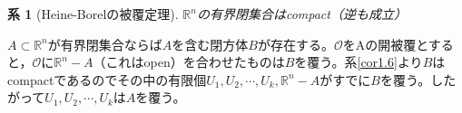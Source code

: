 \documentclass[dvipdfmx,a4j,10pt]{jsarticle}
\makeatletter
\theoremstyle{mystyle1}
\newtheorem{cor}[dfn]{系}
\theoremstyle{mystyle2}
\renewenvironment{proof}[1][\proofname]{\par
  \pushQED{\qed}%
  \normalfont
  \topsep6\p@\@plus6\p@ \trivlist
  \item[\hskip\labelsep{\bfseries\sffamily #1}]\ignorespaces
}{%
  \popQED\endtrivlist\@endpefalse
}
\renewcommand\proofname{証明}
\makeatother
\begin{document}
\begin{framed}
    \begin{cor}[Heine-Borelの被覆定理]
        $\mathbb{R}^n$の有界閉集合はcompact（逆も成立）
    \end{cor}
\end{framed}

\begin{proof}
    $A\subset\mathbb{R}^n$が有界閉集合ならば$A$を含む閉方体$B$が存在する。$\mathscr{O}$をAの開被覆とすると，$\mathscr{O}$に$\mathbb{R}^n-A$（これはopen）を合わせたものは$B$を覆う。系\ref{cor1.6}より$B$はcompactであるのでその中の有限個$U_1,U_2,\cdots,U_k,\mathbb{R}^n-A$がすでに$B$を覆う。したがって$U_1,U_2,\cdots,U_k$は$A$を覆う。
\end{proof}


\newpage
\end{document}
